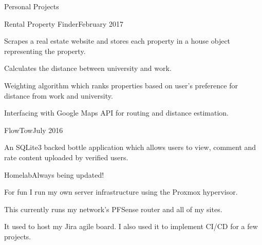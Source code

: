 \documentclass{resume} %
\begin{document}

\begin{rSection}{Personal Projects}

\begin{rSubsection}{Rental Property Finder}{February 2017}{\href{https://github.com/Tyler-Cash/FindRentalHome}{\color{blue}{Github Repository}}}{}
\item Scrapes a real estate website and stores each property in a house object representing the property.
\item Calculates the distance between university and work.
\item Weighting algorithm which ranks properties based on user's preference for distance from work and university.
\item Interfacing with Google Maps API for routing and distance estimation.
\end{rSubsection}


\begin{rSubsection}{FlowTow}{July 2016}{\href{https://github.com/Tyler-Cash/FlowTow}{\color{blue}{Github Repository}}}{}
\item An SQLite3 backed bottle application which allows users to view, comment and rate content uploaded by verified users.
\end{rSubsection}


\begin{rSubsection}{Homelab}{Always being updated!}{}{}
\item For fun I run my own server infrastructure using the Proxmox hypervisor.
\item This currently runs my network's PFSense router and all of my sites.
\item It used to host my Jira agile board. I also used it to implement CI/CD for a few projects. 
\end{rSubsection}

\end{rSection}

\end{document}
